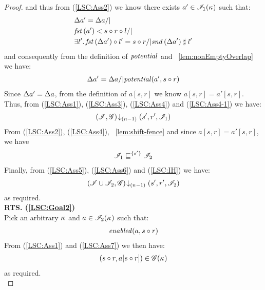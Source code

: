 \begin{lemma}
\begin{proof}
%
and thus from (\ref{LSC:Ass2}) we know there exists $a' \in \mathscr{I}_1(\kappa_{})$ such that: 
%
\begin{align*}
	& \updateFP{a'} = \updateFP{a} /|\\
	& \fst{a'} < s \composeL r \composeL l /| \null\\
	& \exsts{l'} \fst{\updateFP{a'}} \composeL l' = s \composeL r /| \snd{\updateFP{a'}} \compatible l'
\end{align*}
%
and consequently from the definition of $\mathit{potential}$ and \lem~\ref{lem:nonEmptyOverlap} we have: 
%
\begin{align}
	\Delta {a'} = \Delta {a} /| \mathit{potential}(a', s \circ r) \label{LSC:Ass4-1}
\end{align}
Since $\Delta {a'} = \Delta {a}$, from the definition of $a[s, r]$ we know $a[s, r] = a'[s, r]$. Thus, from (\ref{LSC:Ass1}), (\ref{LSC:Ass3}), (\ref{LSC:Ass4}) and (\ref{LSC:Ass4-1}) we have:
%
\begin{align}
	\left(\mathscr{I}, \mathscr{G}\right) \!\downarrow_{(n-1)} \left(s', r', \mathscr{I}_1\right) \label{LSC:Ass5}
\end{align}
%
From (\ref{LSC:Ass2}), (\ref{LSC:Ass4}), \lem~\ref{lem:shift-fence} and since $a[s, r] = a'[s, r]$, we have
%
\begin{align}
	\mathscr{I}_1 \sqsubseteq^{\{s'\}} \mathscr{I}_2 \label{LSC:Ass6}
\end{align}
%
Finally, from (\ref{LSC:Ass5}), (\ref{LSC:Ass6}) and (\ref{LSC:IH}) we have:
%
\begin{align*}
	\left(\mathscr{I} \cup \mathscr{I}_2, \mathscr{G}\right) \!\downarrow_{(n-1)} \left(s', r', \mathscr{I}_2\right)
\end{align*}
%
as required.\\
%
%
%
%



\noindent\textbf{RTS. (\ref{LSC:Goal2})} \\
Pick an arbitrary $\kappa_{}$ and $a \in \mathscr{I}_2(\kappa_{})$ such that:
\begin{align}
	\mathit{enabled}(a, s \circ r)\label{LSC:Ass7}
\end{align}
From (\ref{LSC:Ass1}) and (\ref{LSC:Ass7}) we then have:
%
\begin{align*}
	(s \circ r, a[s \circ r]) \in \mathscr{G}(\kappa_{})
\end{align*}
%
as required.\\
%
%
%



\end{proof}
\end{lemma}

